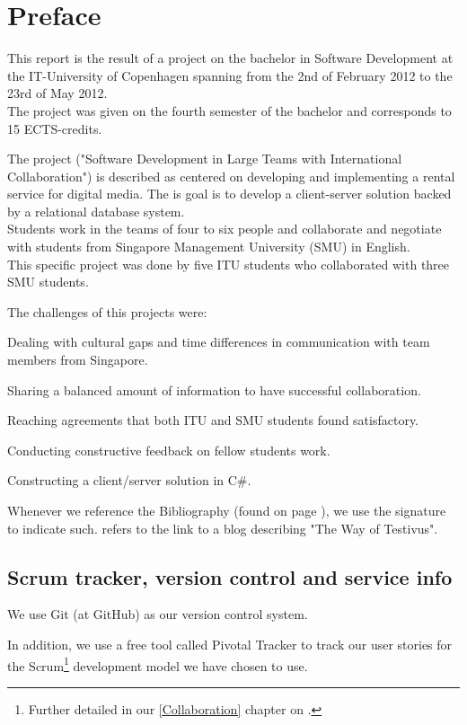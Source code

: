 \chapter{Preface}
\label{Preface}
This report is the result of a project on the bachelor in Software Development at the IT-University of Copenhagen spanning from the 2nd of February 2012 to the 23rd of May 2012. \\The project was given on the fourth semester of the bachelor and corresponds to 15 ECTS-credits.

The project ("Software Development in Large Teams with International Collaboration") is described as centered on developing and implementing a rental service for digital media. The is goal is to develop a client-server solution backed by a relational database system. \\Students work in the teams of four to six people and collaborate and negotiate with students from Singapore Management University (SMU) in English.\\This specific project was done by five ITU students who collaborated with three SMU students.

The challenges of this projects were:
\begin{my_itemize}
\item Dealing with cultural gaps and time differences in communication with team members from Singapore.
\item Sharing a balanced amount of information to have successful collaboration.
\item Reaching agreements that both ITU and SMU students found satisfactory.
\item Conducting constructive feedback on fellow students work.
\item Constructing a client/server solution in C\#.
\end{my_itemize}
Whenever we reference the Bibliography (found on page \pageref{Biblio}), we use the signature \cite{WoT} to indicate such. \cite{WoT} refers to the link to a blog describing "The Way of Testivus".

\section{Scrum tracker, version control and service info}
\label{Preface_Trackers}
We use Git (at GitHub) as our version control system.

In addition, we use a free tool called Pivotal Tracker to track our user stories for the Scrum\footnote{Further detailed in our \ref{Collaboration} chapter on \pageref{Collaboration}.} development model we have chosen to use.

